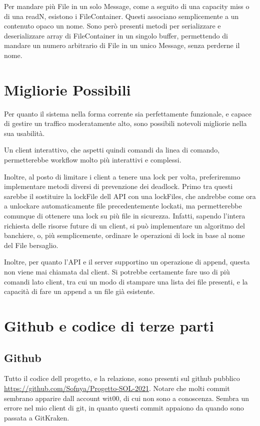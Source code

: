 \documentclass[11pt]{article}
\begin{document}
\begin{flushleft}
Per mandare più File in un solo Message, come a seguito di una capacity miss o di una readN, esistono i FileContainer. Questi associano semplicemente a un contenuto opaco un nome. Sono però presenti metodi per serializzare e deserializzare array di FileContainer in un singolo buffer, permettendo di mandare un numero arbitrario di File in un unico Message, senza perderne il nome.

\section{Migliorie Possibili}

Per quanto il sistema nella forma corrente sia perfettamente funzionale, e capace di gestire un traffico moderatamente alto, sono possibili notevoli migliorie nella sua usabilità.

Un client interattivo, che aspetti quindi comandi da linea di comando, permetterebbe workflow molto più interattivi e complessi.

Inoltre, al posto di limitare i client a tenere una lock per volta, preferiremmo implementare metodi diversi di prevenzione dei deadlock. Primo tra questi sarebbe il sostituire la lockFile dell API con una lockFiles, che andrebbe come ora a unlockare automaticamente file precedentemente lockati, ma permetterebbe comunque di ottenere una lock su più file in sicurezza. Infatti, sapendo l'intera richiesta delle risorse future di un client, si può implementare un algoritmo del banchiere, o, più semplicemente, ordinare le operazioni di lock in base al nome del File bersaglio.

Inoltre, per quanto l'API e il server supportino un operazione di append, questa non viene mai chiamata dal client. Si potrebbe certamente fare uso di più comandi lato client, tra cui un modo di stampare una lista dei file presenti, e la capacità di fare un append a un file già esistente.

\section{Github e codice di terze parti}
\subsection{Github}
Tutto il codice dell progetto, e la relazione, sono presenti sul github pubblico \url{https://github.com/Sofnya/Progetto-SOL-2021}.
Notare che molti commit sembrano apparire dall account wit00, di cui non sono a conoscenza. Sembra un errore nel mio client di git, in quanto questi commit appaiono da quando sono passata a GitKraken.


\end{flushleft}
\end{document}
